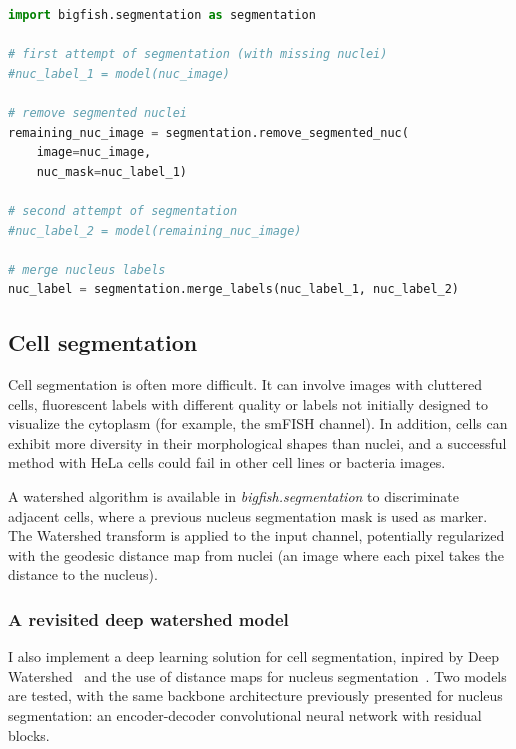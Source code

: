 \begin{minipage}{0.9\textwidth}
\begin{lstlisting}[language=Python]
import bigfish.segmentation as segmentation

# first attempt of segmentation (with missing nuclei)
#nuc_label_1 = model(nuc_image)

# remove segmented nuclei
remaining_nuc_image = segmentation.remove_segmented_nuc(
	image=nuc_image,
	nuc_mask=nuc_label_1)

# second attempt of segmentation
#nuc_label_2 = model(remaining_nuc_image)

# merge nucleus labels
nuc_label = segmentation.merge_labels(nuc_label_1, nuc_label_2)
\end{lstlisting}
\end{minipage}

\subsection{Cell segmentation}
\label{subsec:segmentation_cell}

Cell segmentation is often more difficult.
It can involve images with cluttered cells, fluorescent labels with different quality or labels not initially designed to visualize the cytoplasm (for example, the \ac{smFISH} channel).
In addition, cells can exhibit more diversity in their morphological shapes than nuclei, and a successful method with HeLa cells could fail in other cell lines or bacteria images.

A watershed algorithm is available in \emph{bigfish.segmentation} to discriminate adjacent cells, where 
a previous nucleus segmentation mask is used as marker. The Watershed transform is applied to the input channel, potentially regularized with the geodesic distance map from nuclei (an image where each pixel takes the distance to the nucleus). 


\subsubsection{A revisited deep watershed model}

I also implement a deep learning solution for cell segmentation, inpired by Deep Watershed~\cite{Bai_2017_CVPR} and the use of distance maps for nucleus segmentation~\cite{Naylor_2019}.
Two models are tested, with the same backbone architecture previously presented for nucleus segmentation: an encoder-decoder convolutional neural network with residual blocks.

